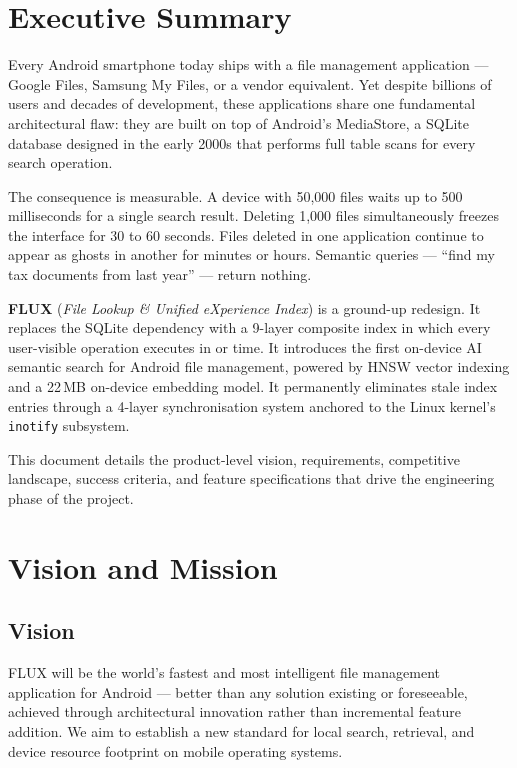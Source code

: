 \chapter{Executive Summary}

Every Android smartphone today ships with a file management application --- Google Files, Samsung My Files, or a vendor equivalent. Yet despite billions of users and decades of development, these applications share one fundamental architectural flaw: they are built on top of Android's MediaStore, a SQLite database designed in the early 2000s that performs full table scans for every search operation.

The consequence is measurable. A device with 50,000 files waits up to 500 milliseconds for a single search result. Deleting 1,000 files simultaneously freezes the interface for 30 to 60 seconds. Files deleted in one application continue to appear as ghosts in another for minutes or hours. Semantic queries --- ``find my tax documents from last year'' --- return nothing.

\textbf{FLUX} (\textit{File Lookup \& Unified eXperience Index}) is a ground-up redesign. It replaces the SQLite dependency with a 9-layer composite index in which every user-visible operation executes in  or  time. It introduces the first on-device AI semantic search for Android file management, powered by HNSW vector indexing and a 22\,MB on-device embedding model. It permanently eliminates stale index entries through a 4-layer synchronisation system anchored to the Linux kernel's \texttt{inotify} subsystem.

This document details the product-level vision, requirements, competitive landscape, success criteria, and feature specifications that drive the engineering phase of the project.

\chapter{Vision and Mission}

\section{Vision}
FLUX will be the world's fastest and most intelligent file management application for Android --- better than any solution existing or foreseeable, achieved through architectural innovation rather than incremental feature addition. We aim to establish a new standard for local search, retrieval, and device resource footprint on mobile operating systems.

